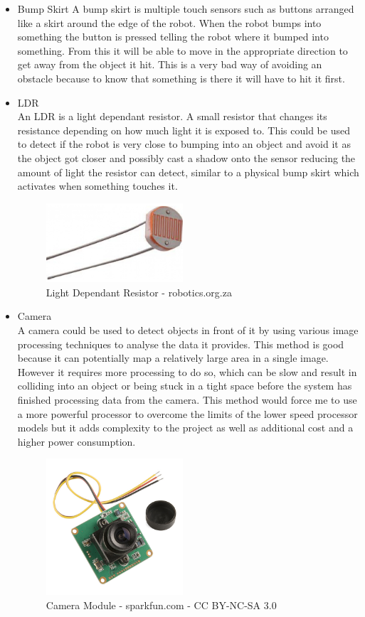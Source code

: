 \begin{itemize}
\item Bump Skirt
A bump skirt is multiple touch sensors such as buttons arranged like a skirt around the edge of the robot.  When the robot bumps into something the button is pressed telling the robot where it bumped into something.  From this it will be able to move in the appropriate direction to get away from the object it hit.  This is a very bad way of avoiding an obstacle because to know that something is there it will have to hit it first.

\item LDR
\\An LDR is a light dependant resistor.  A small resistor that changes its resistance depending on how much light it is exposed to.  This could be used to detect if the robot is very close to bumping into an object and avoid it as the object got closer and possibly cast a shadow onto the sensor reducing the amount of light the resistor can detect, similar to a physical bump skirt which activates when something touches it.
\begin{figure}[H]
\centering
        \includegraphics[width=2.0in] {Images/ldr.jpg}
        \caption{Light Dependant Resistor - robotics.org.za}
        \label{Light Dependant Resistor}
\end{figure}

\item Camera
\\A camera could be used to detect objects in front of it by using various image processing techniques to analyse the data it provides.  This method is good because it can potentially map a relatively large area in a single image.  However it requires more processing to do so, which can be slow and result in colliding into an object or being stuck in a tight space before the system has finished processing data from the camera.  This method would force me to use a more powerful processor to overcome the limits of the lower speed processor models but it adds complexity to the project as well as additional cost and a higher power consumption.
\begin{figure}[H]
\centering
        \includegraphics[width=2.0in] {Images/camera.jpg}
        \caption{Camera Module - sparkfun.com - CC BY-NC-SA 3.0}
        \label{Camera Module}
\end{figure}


\end{itemize}
